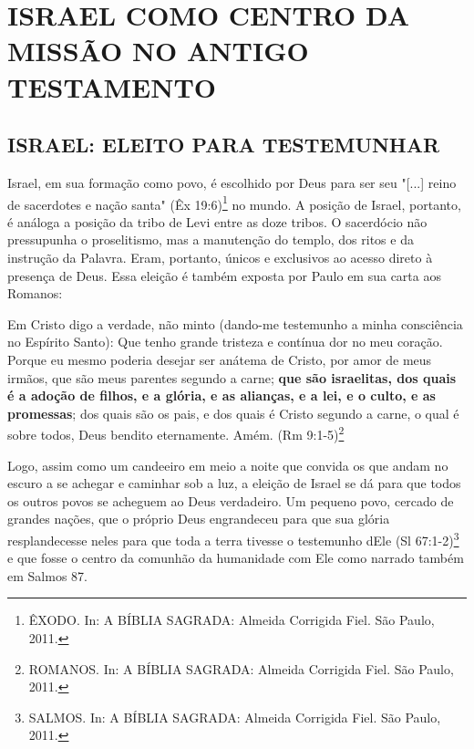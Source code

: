 \documentclass[
    article,            %
	12pt,				%
	oneside,			%
	a4paper,			%
	chapter=TITLE,		%
	section=TITLE,		%
	english,			%
	french,				%
	spanish,			%
	brazil				%
	]{abntex2}
\begin{document}
\section{ISRAEL COMO CENTRO DA MISSÃO NO ANTIGO TESTAMENTO}
\subsection{ISRAEL: ELEITO PARA TESTEMUNHAR}
Israel, em sua formação como povo, é escolhido por Deus para ser seu "[...] reino de sacerdotes e nação santa" (Êx 19:6)\footnote{ÊXODO. In: A BÍBLIA SAGRADA: Almeida Corrigida Fiel. São Paulo, 2011.} no mundo. A posição de Israel, portanto, é análoga a posição da tribo de Levi entre as doze tribos. O sacerdócio não pressupunha o proselitismo, mas a manutenção do templo, dos ritos e da instrução da Palavra. Eram, portanto, únicos e exclusivos ao acesso direto à presença de Deus. Essa eleição é também exposta por Paulo em sua carta aos Romanos:
\begin{citacao}
Em Cristo digo a verdade, não minto (dando-me testemunho a minha consciência no Espírito Santo): Que tenho grande tristeza e contínua dor no meu coração. Porque eu mesmo poderia desejar ser anátema de Cristo, por amor de meus irmãos, que são meus parentes segundo a carne; \textbf{que são israelitas, dos quais é a adoção de filhos, e a glória, e as alianças, e a lei, e o culto, e as promessas}; dos quais são os pais, e dos quais é Cristo segundo a carne, o qual é sobre todos, Deus bendito eternamente. Amém. (Rm 9:1-5)\footnote{ROMANOS. In: A BÍBLIA SAGRADA: Almeida Corrigida Fiel. São Paulo, 2011.}
\end{citacao}
Logo, assim como um candeeiro em meio a noite que convida os que andam no escuro a se achegar e caminhar sob a luz, a eleição de Israel se dá para que todos os outros povos se acheguem ao Deus verdadeiro. Um pequeno povo, cercado de grandes nações, que o próprio Deus engrandeceu para que sua glória resplandecesse neles para que toda a terra tivesse o testemunho dEle (Sl 67:1-2)\footnote{SALMOS. In: A BÍBLIA SAGRADA: Almeida Corrigida Fiel. São Paulo, 2011.} e que fosse o centro da comunhão da humanidade com Ele como narrado também em Salmos 87.
\end{document}
